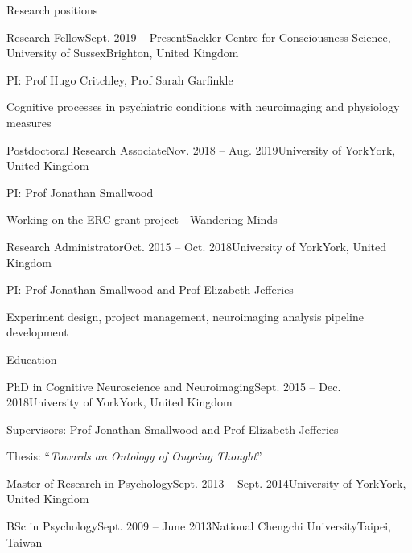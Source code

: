 \documentclass{resume} %
\begin{document}

\begin{rSection}{Research positions}
  \begin{rSubsection}{Research Fellow}{Sept. 2019 -- Present}{Sackler Centre for Consciousness Science, University of Sussex}{Brighton, United Kingdom}
    \item PI: Prof Hugo Critchley, Prof Sarah Garfinkle
    \item Cognitive processes in psychiatric conditions with neuroimaging and physiology measures
  \end{rSubsection}

  \begin{rSubsection}{Postdoctoral Research Associate}{Nov. 2018 -- Aug. 2019}{University of York}{York, United Kingdom}
  \item PI: Prof Jonathan Smallwood
  \item Working on the ERC grant project---Wandering Minds
  \end{rSubsection}

  \begin{rSubsection}{Research Administrator}{Oct. 2015 -- Oct. 2018}{University of York}{York, United Kingdom}
    \item PI: Prof Jonathan Smallwood and Prof Elizabeth Jefferies
    \item Experiment design, project management, neuroimaging analysis pipeline development
  \end{rSubsection}

  \end{rSection}


\begin{rSection}{Education}

  \begin{rSubsection}{PhD in Cognitive Neuroscience and Neuroimaging}{Sept. 2015 -- Dec. 2018}{University of York}{York, United Kingdom}
    \item Supervisors: Prof Jonathan Smallwood and Prof Elizabeth Jefferies
    \item Thesis: ``\textit{Towards an Ontology of Ongoing Thought}''
  \end{rSubsection}

  \begin{EDUrSubsection}{Master of Research in Psychology}{Sept. 2013 -- Sept. 2014}{University of York}{York, United Kingdom}
  \end{EDUrSubsection}

  \begin{EDUrSubsection}{BSc in Psychology}{Sept. 2009 -- June 2013}{National Chengchi University}{Taipei, Taiwan}
  \end{EDUrSubsection}

  \end{rSection}
\end{document}
